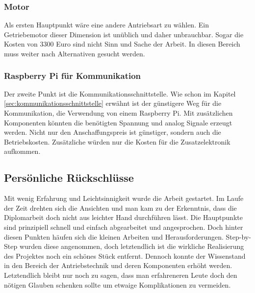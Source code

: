 \subsubsection{Motor}
\label{sec:verbesserungMotor}

Als ersten Hauptpunkt wäre eine andere Antriebsart zu wählen. Ein Getriebemotor dieser Dimension  ist unüblich und daher unbrauchbar. Sogar die Kosten von 3300 Euro sind nicht Sinn und Sache der Arbeit.  In diesen Bereich muss weiter nach Alternativen gesucht werden. 

\subsubsection{Raspberry Pi für Kommunikation}
\label{sec:raspberryPiKommunikation}

Der zweite Punkt ist die Kommunikationsschnittstelle. Wie schon im Kapitel \ref{sec:kommunikationsschnittstelle} erwähnt ist der günstigere Weg für die Kommunikation, die Verwendung von einem Raspberry Pi. Mit zusätzlichen Komponenten könnten die benötigten Spannung und analog Signale erzeugt werden. Nicht nur den Anschaffungspreis ist günstiger, sondern auch die Betriebskosten. Zusätzliche würden nur die Kosten für die Zusatzelektronik aufkommen. 

\subsection{Persönliche Rückschlüsse}
\label{sec:persönlicheRückschlüsse}

Mit wenig Erfahrung und Leichtsinnigkeit wurde die Arbeit gestartet. Im Laufe der Zeit drehten sich die Ansichten und man kam zu der Erkenntnis, dass die Diplomarbeit doch nicht aus leichter Hand durchführen lässt. Die Hauptpunkte sind prinzipiell schnell und einfach abgearbeitet und angesprochen. Doch hinter diesen Punkten häufen sich die kleinen Arbeiten und Herausforderungen. Step-by-Step wurden diese angenommen, doch letztendlich ist die wirkliche Realisierung des Projektes noch ein schönes Stück entfernt. Dennoch konnte der Wissenstand in den Bereich der Antriebstechnik und deren Komponenten erhöht werden. Letztendlich bleibt nur noch zu sagen, dass man erfahreneren Leute doch den nötigen Glauben schenken sollte um etwaige Komplikationen zu vermeiden. 
